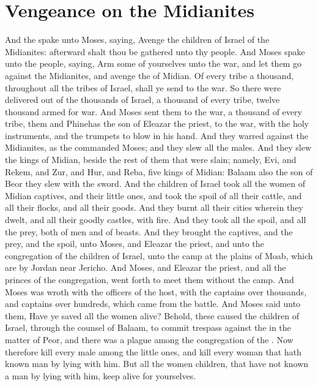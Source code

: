 \section*{Vengeance on the Midianites}
\begin{biblechapter} %
\verse And the \LORD spake unto Moses, saying,
\verse Avenge the children of Israel of the Midianites: afterward shalt thou be gathered unto thy people.
\verse And Moses spake unto the people, saying, Arm some of yourselves unto the war, and let them go against the Midianites, and avenge the \LORD of Midian.
\verse Of every tribe a thousand, throughout all the tribes of Israel, shall ye send to the war.
\verse So there were delivered out of the thousands of Israel, a thousand of every tribe, twelve thousand armed for war.
\verse And Moses sent them to the war, a thousand of every tribe, them and Phinehas the son of Eleazar the priest, to the war, with the holy instruments, and the trumpets to blow in his hand.
\verse And they warred against the Midianites, as the \LORD commanded Moses; and they slew all the males.
\verse And they slew the kings of Midian, beside the rest of them that were slain; namely, Evi, and Rekem, and Zur, and Hur, and Reba, five kings of Midian: Balaam also the son of Beor they slew with the sword.
\verse And the children of Israel took all the women of Midian captives, and their little ones, and took the spoil of all their cattle, and all their flocks, and all their goods.
\verse And they burnt all their cities wherein they dwelt, and all their goodly castles, with fire.
\verse And they took all the spoil, and all the prey, both of men and of beasts.
\verse And they brought the captives, and the prey, and the spoil, unto Moses, and Eleazar the priest, and unto the congregation of the children of Israel, unto the camp at the plains of Moab, which are by Jordan near Jericho.
\verse And Moses, and Eleazar the priest, and all the princes of the congregation, went forth to meet them without the camp.
\verse And Moses was wroth with the officers of the host, with the captains over thousands, and captains over hundreds, which came from the battle.
\verse And Moses said unto them, Have ye saved all the women alive?
\verse Behold, these caused the children of Israel, through the counsel of Balaam, to commit trespass against the \LORD in the matter of Peor, and there was a plague among the congregation of the \LORD.
\verse Now therefore kill every male among the little ones, and kill every woman that hath known man by lying with him.
\verse But all the women children, that have not known a man by lying with him, keep alive for yourselves.

\end{biblechapter}
